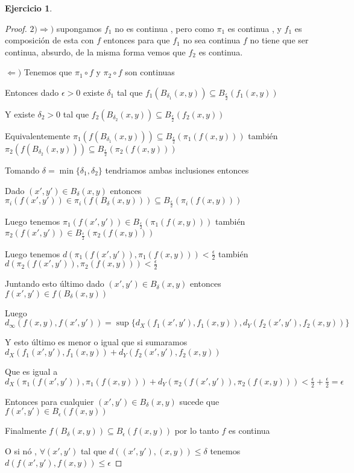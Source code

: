 \documentclass[12pt]{article}
\newcommand{\Ra}{\Rightarrow}
\theoremstyle{definition}
\newtheorem{ej}{Ejercicio}
\begin{document}
\begin{ej}
\begin{proof}
 $2) \Ra )$  supongamos $f_1$ no es continua , pero como $\pi_1$ es continua , y $f_1$ es composición de esta con $f$ entonces para que $f_1$ no sea continua $f$ no tiene que ser continua, absurdo, de la misma forma vemos que $f_2$ es continua.

$\Leftarrow ) $ Tenemos que $\pi_1 \circ f$ y $\pi_2 \circ f$ son continuas 

Entonces dado $\epsilon > 0$ existe $\delta_1$ tal que $f_1(B_{\delta_1}(x,y)) \subseteq B_{\frac{\epsilon}{2}}(f_1(x,y))$

Y existe $\delta_2 >0$ tal que $f_2(B_{\delta_2}(x,y)) \subseteq B_{\frac{\epsilon}{2}}(f_2(x,y))$

Equivalentemente $\pi_1(f(B_{\delta_1}(x,y))) \subseteq B_{\frac{\epsilon}{2}}(\pi_1(f(x,y)))$ también $\pi_2(f(B_{\delta_2}(x,y))) \subseteq B_{\frac{\epsilon}{2}}(\pi_2(f(x,y)))$

Tomando $\delta = \min\{\delta_1,\delta_2\}$ tendriamos ambas inclusiones entonces 

Dado $(x',y') \in B_\delta(x,y)$ entonces $\pi_i(f(x',y')) \in \pi_i(f(B_{\delta}(x,y)))  \subseteq B_{\frac{\epsilon}{2}}(\pi_i(f(x,y))) $

Luego tenemos $\pi_1(f(x',y')) \in B_{\frac{\epsilon}{2}}(\pi_1(f(x,y))) $ también $\pi_2(f(x',y')) \in B_{\frac{\epsilon}{2}}(\pi_2(f(x,y)))$

  Luego tenemos $d(\pi_1(f(x',y')),\pi_1(f(x,y))) < \frac{\epsilon}{2}$ también $d(\pi_2(f(x',y')),\pi_2(f(x,y))) < \frac{\epsilon}{2}$

  Juntando esto último dado $(x',y') \in B_{\delta}(x,y)$ entonces $f(x',y') \in f(B_{\delta}(x,y))$

Luego $d_{\infty}(f(x,y),f(x',y')) =\sup \{d_X(f_1(x',y'),f_1(x,y)), d_Y(f_2(x',y'),f_2(x,y))\} $

Y esto último es menor o igual que si sumaramos $d_X(f_1(x',y'),f_1(x,y)) +  d_Y(f_2(x',y'),f_2(x,y))$

Que es igual a $ d_X(\pi_1(f(x',y')),\pi_1(f(x,y))) + d_Y(\pi_2(f(x',y')),\pi_2(f(x,y))) < \frac{\epsilon}{2} + \frac{\epsilon}{2} = \epsilon$

  Entonces para cualquier $(x',y') \in B_{\delta}(x,y)$ sucede que $f(x',y') \in B_{\epsilon}(f(x,y))$

Finalmente $f(B_{\delta}(x,y)) \subseteq B_{\epsilon}(f(x,y))$ por lo tanto $f$ es continua

O si nó , $\forall (x',y')$ tal que $d((x',y'),(x,y)) \leq \delta$ tenemos $d(f(x',y'),f(x,y))\leq \epsilon$
   \end{proof}
 \end{ej}
\end{document}
